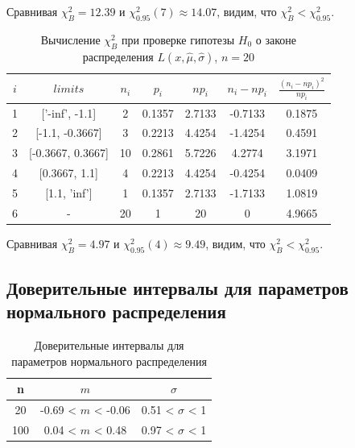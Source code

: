 \documentclass[../main.tex]{subfiles}
\begin{document}
    \noindent Сравнивая $\chi^{2}_{B} = 12.39$ и $\chi^{2}_{0.95}(7) \approx 14.07$, видим, что $\chi^{2}_{B} < \chi^{2}_{0.95}$.
    \\
    
    \begin{table}[H]
    	\centering
    	\begin{tabular}{| c | c | c | c | c | c | c |}
    		\hline
    		$i$ & $limits$         &   $n_i$ &    $p_i$ &   $np_i$ &   $n_i - np_i$ &   $\frac{(n_i-np_i)^2}{np_i}$ \\
            \hline
                1 & ['-inf', -1.1]    &  2 & 0.1357 &  2.7133 & -0.7133 & 0.1875 \\
                2 & [-1.1, -0.3667]   &  3 & 0.2213 &  4.4254 & -1.4254 & 0.4591 \\
                3 & [-0.3667, 0.3667] & 10 & 0.2861 &  5.7226 &  4.2774 & 3.1971 \\
                4 & [0.3667, 1.1]     &  4 & 0.2213 &  4.4254 & -0.4254 & 0.0409 \\
                5 & [1.1, 'inf']      &  1 & 0.1357 &  2.7133 & -1.7133 & 1.0819 \\
                6 & -                 & 20 & 1      & 20      &  0      & 4.9665 \\
            \hline
    	\end{tabular}
    	\caption{ Вычисление $\chi^{2}_{B}$ при проверке гипотезы $H_{0}$ о законе распределения $L(x,\hat{\mu}, \hat{\sigma})$, $n=20$}
    	\label{tab:laplace_chi_2}
    \end{table}
    
    \noindent Сравнивая $\chi^{2}_{B} =  4.97$ и $\chi^{2}_{0.95}(4) \approx 9.49$, видим, что $\chi^{2}_{B} < \chi^{2}_{0.95}$.
    \\
    
    \subsection{Доверительные интервалы для параметров нормального распределения}
    
	\begin{table}[H]
	    \centering
	    \begin{tabular}{| c | c | c |}
	    \hline
	       n    &  $m$  & $\sigma$\\ \hline
	        20  &  -0.69 < $m$ < -0.06 & 0.51 < $\sigma$ < 1 \\ \hline
	       100   & 0.04 < $m$ < 0.48 & 0.97 < $\sigma$ < 1 \\
	   \hline
	    \end{tabular}
	    \caption{Доверительные интервалы для параметров нормального распределения}
	    \label{tab:interv_simple}
	\end{table}
	
\end{document}
